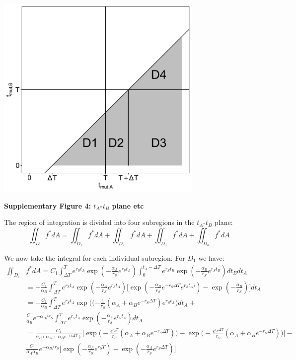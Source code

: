\documentclass{article}
\begin{document}
\begin{center}
\includegraphics[width=0.75\textwidth]{Subintegral}

\textbf{Supplementary Figure 4: $t_A$-$t_B$ plane etc}
\end{center}

The region of integration is divided into four subregions in the $t_A$-$t_B$ plane:
\begin{equation}
\iint_D f^* dA = \iint_{D_1} f^* dA + \iint_{D_2} f^* dA + \iint_{D_3} f^* dA + \iint_{D_4} f^* dA
\end{equation}

We now take the integral for each individual subregion.  For $D_1$ we have:
\begin{equation}
\begin{split}
\iint_{D_1} & f^* dA = C_1 \int_{\Delta T}^T e^{r_S t_A} \exp(-\frac{\alpha_A}{r_S} e^{r_S t_A}) \int_0^{t_A - \Delta T} e^{r_S t_B} \exp(-\frac{\alpha_B}{r_S} e^{r_S t_B}) dt_B dt_A \\
&= -\frac{C_1}{\alpha_B} \int_{\Delta T}^T e^{r_S t_A} \exp(-\frac{\alpha_A}{r_S} e^{r_S t_A}) \Big[\exp(-\frac{\alpha_B}{r_S} e^{-r_S \Delta T} e^{r_S t_A)}) - \exp(-\frac{\alpha_B}{r_S})\Big] dt_A \\
& = -\frac{C_1}{\alpha_B} \int_{\Delta T}^T e^{r_S t_A} \exp\Big((-\frac{1}{r_S}(\alpha_A + \alpha_B e^{-r_S \Delta T}) e^{r_S t_A}\Big) dt_A +\\
& \frac{C_1}{\alpha_B} e^{-\alpha_B/r_S} \int_{\Delta T}^T e^{r_S t_A} \exp(-\frac{\alpha_A}{r_S} e^{r_S t_A}) dt_A \\
&= \frac{C_1}{\alpha_B(\alpha_A + \alpha_B e^{-r_S \Delta T})} \Big[\exp\Big(-\frac{e^{r_S T}}{r_S} (\alpha_A + \alpha_B e^{-r_S \Delta T})\Big) - \exp\Big(-\frac{e^{r_S \Delta T}}{r_S} (\alpha_A + \alpha_B e^{-r_S \Delta T})\Big)\Big] - \\
&\frac{C_1}{\alpha_A \alpha_B} e^{-\alpha_B/r_S} \Big[\exp(-\frac{\alpha_A}{r_S} e^{r_S T}) - \exp(-\frac{\alpha_A}{r_S} e^{r_S \Delta T})\Big] 
\end{split}
\end{equation}
\end{document}
